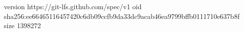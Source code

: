 version https://git-lfs.github.com/spec/v1
oid sha256:ee66465116457420c6db09ccfb9da33dc9acab46ea9799bffb0111710e637b8f
size 1398272
